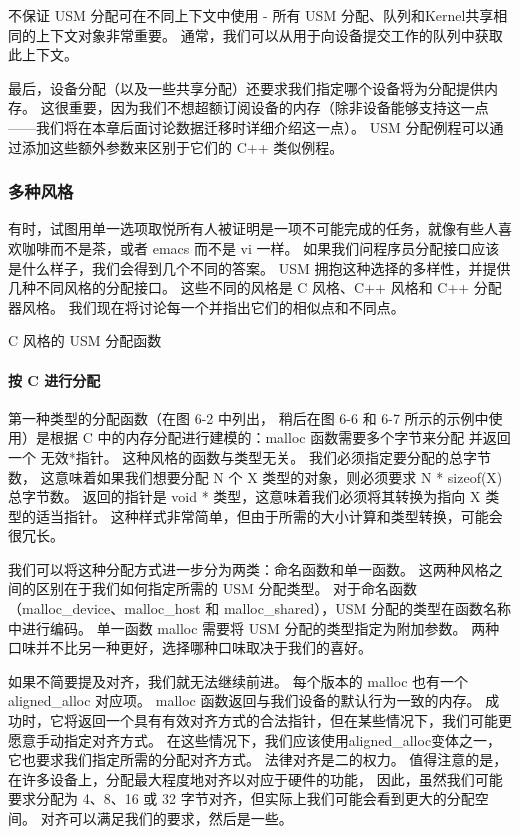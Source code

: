 不保证 USM 分配可在不同上下文中使用 - 所有 USM 分配、队列和Kernel共享相同的上下文对象非常重要。 
通常，我们可以从用于向设备提交工作的队列中获取此上下文。

最后，设备分配（以及一些共享分配）还要求我们指定哪个设备将为分配提供内存。 
这很重要，因为我们不想超额订阅设备的内存（除非设备能够支持这一点——我们将在本章后面讨论数据迁移时详细介绍这一点）。 
USM 分配例程可以通过添加这些额外参数来区别于它们的 C++ 类似例程。

\subsubsection{多种风格}
有时，试图用单一选项取悦所有人被证明是一项不可能完成的任务，就像有些人喜欢咖啡而不是茶，或者 emacs 而不是 vi 一样。 
如果我们问程序员分配接口应该是什么样子，我们会得到几个不同的答案。 
USM 拥抱这种选择的多样性，并提供几种不同风格的分配接口。 
这些不同的风格是 C 风格、C++ 风格和 C++ 分配器风格。 我们现在将讨论每一个并指出它们的相似点和不同点。

{\color{red} C 风格的 USM 分配函数}

\paragraph{按 C 进行分配}

第一种类型的分配函数（在图 6-2 中列出，
稍后在图 6-6 和 6-7 所示的示例中使用）是根据 C 中的内存分配进行建模的：malloc 函数需要多个字节来分配
并返回一个 无效*指针。 这种风格的函数与类型无关。 我们必须指定要分配的总字节数，
这意味着如果我们想要分配 N 个 X 类型的对象，则必须要求 N * sizeof(X) 总字节数。 
返回的指针是 void * 类型，这意味着我们必须将其转换为指向 X 类型的适当指针。
这种样式非常简单，但由于所需的大小计算和类型转换，可能会很冗长。

我们可以将这种分配方式进一步分为两类：命名函数和单一函数。 这两种风格之间的区别在于我们如何指定所需的 USM 分配类型。 
对于命名函数（malloc\_device、malloc\_host 和 malloc\_shared），USM 分配的类型在函数名称中进行编码。 
单一函数 malloc 需要将 USM 分配的类型指定为附加参数。 两种口味并不比另一种更好，选择哪种口味取决于我们的喜好。

如果不简要提及对齐，我们就无法继续前进。 每个版本的 malloc 也有一个aligned\_alloc 对应项。 
malloc 函数返回与我们设备的默认行为一致的内存。 
成功时，它将返回一个具有有效对齐方式的合法指针，但在某些情况下，我们可能更愿意手动指定对齐方式。 
在这些情况下，我们应该使用aligned\_alloc变体之一，它也要求我们指定所需的分配对齐方式。 
法律对齐是二的权力。 值得注意的是，在许多设备上，分配最大程度地对齐以对应于硬件的功能，
因此，虽然我们可能要求分配为 4、8、16 或 32 字节对齐，但实际上我们可能会看到更大的分配空间。 
对齐可以满足我们的要求，然后是一些。

